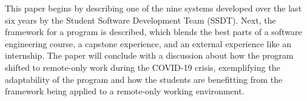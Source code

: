 This paper begins by describing one of the nine systems developed over the last six years by the Student Software Development Team (SSDT). Next, the framework for a program is described, which blends the best parts of a software engineering course, a capstone experience, and an external experience like an internship. The paper will conclude with a discussion about how the program shifted to remote-only work during the COVID-19 crisis, exemplifying the adaptability of the program and how the students are benefitting from the framework being applied to a remote-only working environment.
